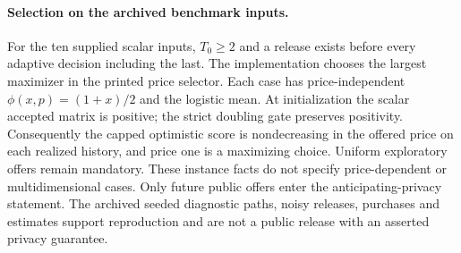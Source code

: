 \documentclass{article}
\begin{document}
\paragraph{Selection on the archived benchmark inputs.}
For the ten supplied scalar inputs, \(T_0\geq2\) and a release exists before every
adaptive decision including the last. The implementation chooses the largest
maximizer in the printed price selector. Each case has price-independent
\(\phi(x,p)=(1+x)/2\) and the logistic mean. At initialization the scalar
accepted matrix is positive; the strict doubling gate preserves positivity.
Consequently the capped optimistic score is nondecreasing in the offered
price on each realized history, and price one is a maximizing choice.
Uniform exploratory offers remain mandatory. These instance facts do not
specify price-dependent or multidimensional cases. Only future public offers
enter the anticipating-privacy statement. The archived seeded diagnostic
paths, noisy releases, purchases and estimates support reproduction and are
not a public release with an asserted privacy guarantee.
\end{document}
